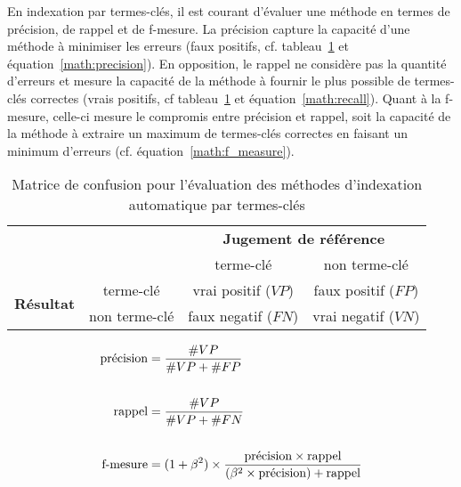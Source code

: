     En indexation par termes-clés, il est courant d'évaluer une méthode en
    termes de précision, de rappel et de f-mesure. La précision capture la
    capacité d'une méthode à minimiser les erreurs (faux positifs, cf.
    tableau~\ref{tab:confusion_matrix} et équation~\ref{math:precision}). En
    opposition, le rappel ne considère pas la quantité d'erreurs et mesure la
    capacité de la méthode à fournir le plus possible de termes-clés correctes
    (vrais positifs, cf tableau~\ref{tab:confusion_matrix} et
    équation~\ref{math:recall}). Quant à la f-mesure, celle-ci mesure le
    compromis entre précision et rappel, soit la capacité de la méthode à
    extraire un maximum de termes-clés correctes en faisant un minimum d'erreurs
    (cf. équation~\ref{math:f_measure}).
    \begin{table}
      \begin{center}
        \begin{tabular}{cc|cc}
          \toprule
          \multicolumn{2}{c|}{} & \multicolumn{2}{c}{\textbf{Jugement de référence}}\\
          \multicolumn{2}{c|}{} & \og{}terme-clé\fg{} & \og{}non terme-clé\fg{}\\
          \hline
          \multirow{2}{*}{\textbf{Résultat}} & \og{}terme-clé\fg{} & vrai positif ($VP$) & faux positif ($FP$)\\
          & \og{}non terme-clé\fg{} & faux negatif ($FN$) & vrai negatif ($VN$)\\
          \bottomrule
        \end{tabular}
        \caption{Matrice de confusion pour l'évaluation des méthodes
                 d'indexation automatique par termes-clés
                \label{tab:confusion_matrix}}
      \end{center}
    \end{table}
    \begin{align}
      \text{précision} &= \frac{\#VP}{\#VP + \#FP} \label{math:precision}\\
      \notag\\
      \text{rappel} &= \frac{\#VP}{\#VP + \#FN} \label{math:recall}\\
      \notag\\
      \text{f-mesure} &= (1 + \beta^2) \times \frac{\text{précision} \times \text{rappel}}{(\beta^2 \times \text{précision}) + \text{rappel}} \label{math:f_measure}
    \end{align}
      

